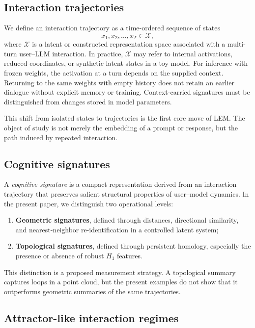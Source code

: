 \documentclass[11pt]{article}
\begin{document}
\subsection{Interaction trajectories}

We define an interaction trajectory as a time-ordered sequence of states
\[
  x_1, x_2, \ldots, x_T \in \mathcal{X},
\]
where $\mathcal{X}$ is a latent or constructed representation space associated with
a multi-turn user--LLM interaction. In practice, $\mathcal{X}$ may refer to internal
activations, reduced coordinates, or synthetic latent states in a toy model.
For inference with frozen weights, the activation at a turn depends on the
supplied context. Returning to the same weights with empty history does not
retain an earlier dialogue without explicit memory or training. Context-carried
signatures must be distinguished from changes stored in model parameters.

This shift from isolated states to trajectories is the first core move of LEM. The
object of study is not merely the embedding of a prompt or response, but the path
induced by repeated interaction.

\subsection{Cognitive signatures}

A \emph{cognitive signature} is a compact representation derived from an
interaction trajectory that preserves salient structural properties of user--model
dynamics. In the present paper, we distinguish two operational levels:

\begin{enumerate}[leftmargin=1.8em]
  \item \textbf{Geometric signatures}, defined through distances, directional
        similarity, and nearest-neighbor re-identification in a controlled latent
        system;
  \item \textbf{Topological signatures}, defined through persistent homology,
        especially the presence or absence of robust $H_1$ features.
\end{enumerate}

This distinction is a proposed measurement strategy. A topological summary
captures loops in a point cloud, but the present examples do not show that it
outperforms geometric summaries of the same trajectories.

\subsection{Attractor-like interaction regimes}
\end{document}
